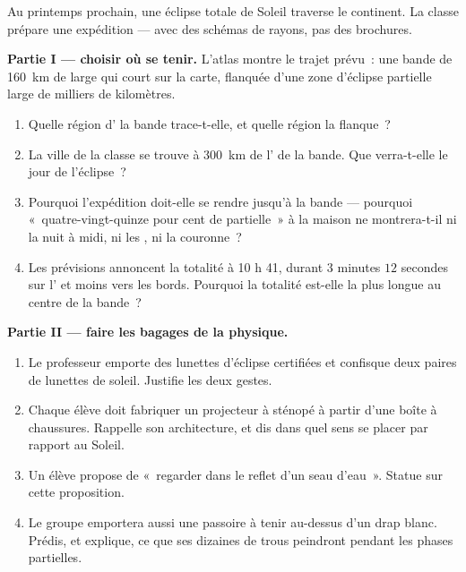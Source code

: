 \begin{problem}\label{pb:g7:shadows-eclipses:1}
Au printemps prochain, une éclipse totale de Soleil traverse le
continent. La classe prépare une expédition --- avec des schémas de
rayons, pas des brochures.

\medskip\noindent\textbf{Partie I --- choisir où se tenir.}
L'atlas montre le trajet prévu~: une bande de \qty{160}{km} de large
qui court sur la carte, flanquée d'une zone d'éclipse partielle large
de milliers de kilomètres.
\begin{enumerate}
  \item Quelle région d' la bande trace-t-elle, et quelle
        région la flanque~?
  \item La ville de la classe se trouve à \qty{300}{km} de l' de
        la bande. Que verra-t-elle le jour de l'éclipse~?
  \item Pourquoi l'expédition doit-elle se rendre jusqu'à la
        bande --- pourquoi «~quatre-vingt-quinze pour cent de
        partielle~» à la maison ne montrera-t-il ni la nuit à midi,
        ni les , ni la couronne~?
  \item Les prévisions annoncent la totalité à 10 h 41, durant $3$
        minutes $12$ secondes sur l' et moins vers les bords.
        Pourquoi la totalité est-elle la plus longue au centre de la
        bande~?
\end{enumerate}

\medskip\noindent\textbf{Partie II --- faire les bagages de la
physique.}
\begin{enumerate}[resume]
  \item Le professeur emporte des lunettes d'éclipse certifiées et
        confisque deux paires de lunettes de soleil. Justifie les
        deux gestes.
  \item Chaque élève doit fabriquer un projecteur à sténopé à
        partir d'une boîte à chaussures. Rappelle son architecture,
        et dis dans quel sens se placer par rapport au Soleil.
  \item Un élève propose de «~regarder dans le reflet d'un seau
        d'eau~». Statue sur cette proposition.
  \item Le groupe emportera aussi une passoire à tenir au-dessus
        d'un drap blanc. Prédis, et explique, ce que ses dizaines
        de trous peindront pendant les phases partielles.
\end{enumerate}


\end{problem}
